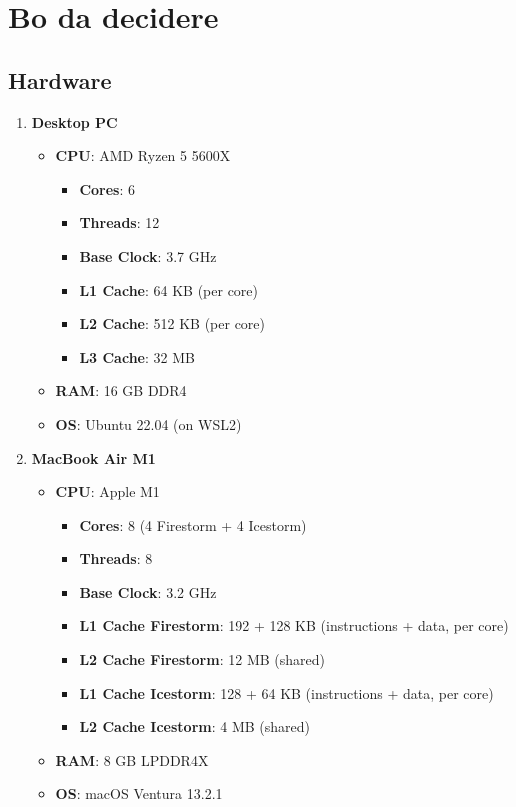 \documentclass{article}
\begin{document}
\section{Bo da decidere}
\subsection{Hardware}
\begin{enumerate}
    \item \textbf{Desktop PC}
    \begin{itemize}
        \item \textbf{CPU}: AMD Ryzen 5 5600X
        \begin{itemize}
            \item \textbf{Cores}: 6
            \item \textbf{Threads}: 12
            \item \textbf{Base Clock}: 3.7 GHz
            \item \textbf{L1 Cache}: 64 KB (per core)
            \item \textbf{L2 Cache}: 512 KB (per core)
            \item \textbf{L3 Cache}: 32 MB
        \end{itemize}
        \item \textbf{RAM}: 16 GB DDR4
        \item \textbf{OS}: Ubuntu 22.04 (on WSL2)
    \end{itemize}
    \item \textbf{MacBook Air M1}
    \begin{itemize}
        \item \textbf{CPU}: Apple M1
        \begin{itemize}
            \item \textbf{Cores}: 8 (4 Firestorm + 4 Icestorm)
            \item \textbf{Threads}: 8
            \item \textbf{Base Clock}: 3.2 GHz
            \item \textbf{L1 Cache Firestorm}: 192 + 128 KB (instructions + data, per core)
            \item \textbf{L2 Cache Firestorm}: 12 MB (shared)
            \item \textbf{L1 Cache Icestorm}: 128 + 64 KB (instructions + data, per core)
            \item \textbf{L2 Cache Icestorm}: 4 MB (shared)
        \end{itemize}
        \item \textbf{RAM}: 8 GB LPDDR4X
        \item \textbf{OS}: macOS Ventura 13.2.1
    \end{itemize}
\end{enumerate}
\end{document}
